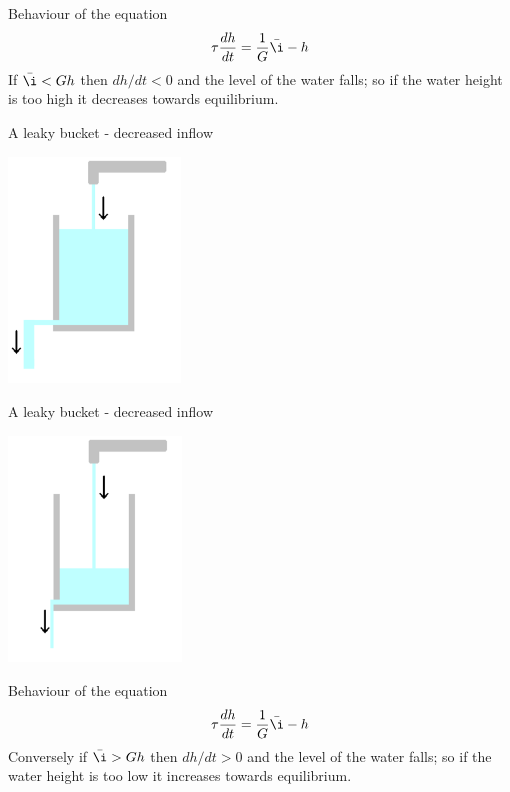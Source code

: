 \documentclass{beamer}
\newcommand{\crish}{\color{reddish}}
\newcommand{\cbla}{\color{black}}
\newcommand{\cblu}{\color{blue}}
\begin{document}
\begin{frame}{Behaviour of the equation}
  \crish
  $$\tau\frac{dh}{dt}=\frac{1}{G}\bar{\i}-h$$\cbla If
  \cblu{}$\bar{\i}<Gh$\cbla{} then \cblu{}$dh/dt<0$\cbla{} and the
  level of the water falls; so if the water height is too high it
  decreases towards equilibrium.
\end{frame}


\begin{frame}{A leaky bucket - decreased inflow}

  \begin{center}
    \includegraphics[height=6cm]{glass_tap_down.png}
  \end{center}
  
  
\end{frame}



\begin{frame}{A leaky bucket - decreased inflow}

  \begin{center}
    \includegraphics[height=6cm]{glass_level_down.png}
  \end{center}
  
\end{frame}


\begin{frame}{Behaviour of the equation}
  \crish
  $$\tau\frac{dh}{dt}=\frac{1}{G}\bar{\i}-h$$\cbla Conversely if
  \cblu{}$\bar{\i}>Gh$\cbla{} then \cblu{}$dh/dt>0$\cbla{} and the
  level of the water falls; so if the water height is too low it
  increases towards equilibrium.
\end{frame}
\end{document}
